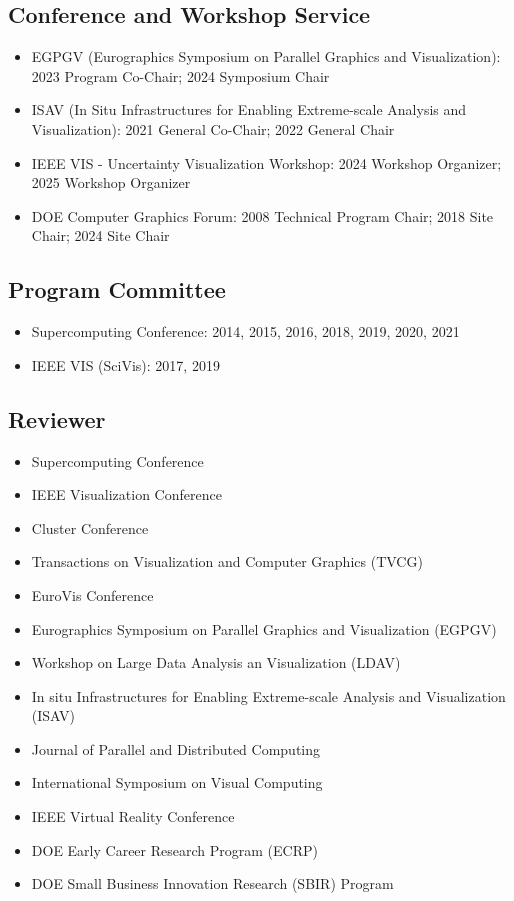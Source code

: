 \documentclass[11pt]{article}
\begin{document}
\subsection*{Conference and Workshop Service}
\begin{itemize}[leftmargin=1.5em]
  \item EGPGV (Eurographics Symposium on Parallel Graphics and Visualization): 2023 Program Co-Chair; 2024 Symposium Chair
  \item ISAV (In Situ Infrastructures for Enabling Extreme-scale Analysis and Visualization): 2021 General Co-Chair; 2022 General Chair
  \item IEEE VIS - Uncertainty Visualization Workshop: 2024 Workshop Organizer; 2025 Workshop Organizer
  \item DOE Computer Graphics Forum: 2008 Technical Program Chair; 2018 Site Chair; 2024 Site Chair
\end{itemize}

\subsection*{Program Committee}
\begin{itemize}[leftmargin=1.5em]
  \item Supercomputing Conference: 2014, 2015, 2016, 2018, 2019, 2020, 2021
  \item IEEE VIS (SciVis): 2017, 2019
\end{itemize}

\subsection*{Reviewer}
\begin{itemize}[leftmargin=1.5em]
  \item Supercomputing Conference
  \item IEEE Visualization Conference
  \item Cluster Conference
  \item Transactions on Visualization and Computer Graphics (TVCG)
  \item EuroVis Conference
  \item Eurographics Symposium on Parallel Graphics and Visualization (EGPGV)
  \item Workshop on Large Data Analysis an Visualization (LDAV)
  \item In situ Infrastructures for Enabling Extreme-scale Analysis and Visualization (ISAV)
  \item Journal of Parallel and Distributed Computing
  \item International Symposium on Visual Computing
  \item IEEE Virtual Reality Conference
  \item DOE Early Career Research Program (ECRP)
  \item DOE Small Business Innovation Research (SBIR) Program
\end{itemize}
\end{document}
